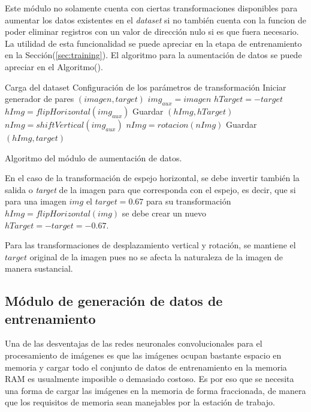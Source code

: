     Este módulo no solamente cuenta con ciertas transformaciones disponibles para aumentar los datos existentes en el \textit{dataset}
    si no también cuenta con la funcion de poder eliminar registros con un valor de dirección nulo si es que fuera necesario. La utilidad
    de esta funcionalidad se puede apreciar en la etapa de entrenamiento en la Sección(\ref{sec:training}). El algoritmo para 
    la aumentación de datos se puede apreciar en el Algoritmo().

    \begin{algorithm}
        \begin{algorithmic}[1]
        \STATE Carga del dataset
        \STATE Configuración de los parámetros de transformación
        \STATE Iniciar generador de pares $(imagen,target)$
            \STATE $img_{aux} = imagen$
                \STATE $hTarget = -target$  
                \STATE $hImg = flipHorizontal(img_{aux})$
                \STATE Guardar $(hImg,hTarget)$
                \STATE $nImg = shiftVertical(img_{aux})$
                \STATE $nImg = rotacion(nImg)$
                \STATE Guardar $(hImg,target)$
            \ENDIF
        \ENDFOR
        
        \end{algorithmic}
        \caption{Algoritmo del módulo de aumentación de datos.}\label{alg:msgsync}
    \end{algorithm}

    En el caso de la transformación de espejo horizontal, se debe invertir también la salida o \textit{target} de la imagen 
    para que corresponda con el espejo, es decir, que si para una imagen $img$ el $target = 0.67$ para su transformación $hImg = flipHorizontal(img)$ 
    se debe crear un nuevo $hTarget = -target = -0.67$. 

    Para las transformaciones de desplazamiento vertical y rotación, se mantiene el $target$ original de la imagen pues no se 
    afecta la naturaleza de la imagen de manera sustancial.


    \subsection{Módulo de generación de datos de entrenamiento}

    Una de las desventajas de las redes neuronales convolucionales para el procesamiento de imágenes es que las imágenes 
    ocupan bastante espacio en memoria y cargar todo el conjunto de datos de entrenamiento en la memoria RAM es usualmente 
    imposible o demasiado costoso. Es por eso que se necesita una forma de cargar las imágenes en la memoria de forma 
    fraccionada, de manera que los requisitos de memoria sean manejables por la estación de trabajo. 

